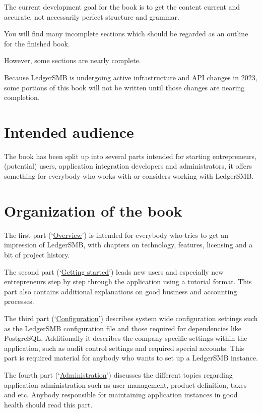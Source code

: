 \documentclass[10pt,a4paper]{book}
\begin{document}
The current development goal for the book is to get the content current and accurate,
not necessarily perfect structure and grammar.

You will find many incomplete sections which should be regarded as an outline for the finished book.

However, some sections are nearly complete.

Because LedgerSMB is undergoing active infrastructure and API changes in 2023, some portions of this book will not be written until those changes are nearing completion.

\section*{Intended audience}
\label{sec-intended-audience}

The book has been split up into several parts intended for starting entrepreneurs,
(potential) users, application integration developers and
administrators, it offers something for everybody who works with or considers working with
LedgerSMB.

\section*{Organization of the book}
\label{sec-book-organization}

The first
part (\lq\hyperref[part-overview]{Overview}\rq) is intended for everybody who tries to get an impression of LedgerSMB, with
chapters on technology, features, licensing and a bit of project history.

The second part
(\lq\hyperref[part-getting-started]{Getting started}\rq) leads new users and especially new entrepreneurs step by step through the
application using a tutorial format. This part also contains additional explanations on good business and accounting
processes.

The third part (\lq\hyperref[part-configuration]{Configuration}\rq) describes system wide configuration settings such as
the LedgerSMB configuration file and those required for dependencies like PostgreSQL. Additionally
it describes the company specific settings within the application, such as audit control settings
and required special accounts. This part is required material for anybody who wants to set up
a LedgerSMB instance.

The fourth part (\lq\hyperref[part-administration]{Administration}\rq) discusses the different topics
regarding application administration such as user management, product definition, taxes and etc.
Anybody responsible for maintaining application instances in good health should read this part.
\end{document}
